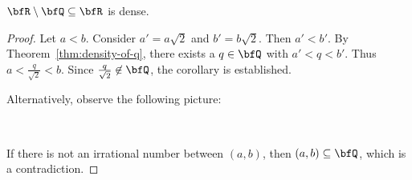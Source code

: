     \begin{corollary}
        $\bfR \setminus \bfQ \subseteq \bfR$ is dense.
    \end{corollary}
        \begin{proof}
            Let $a < b$. Consider $a' = a\sqrt{2}$ and $b' = b\sqrt{2}$. Then $a' < b'$. By Theorem~\ref{thm:density-of-q}, there exists a $q \in \bfQ$ with $a' < q < b'$. Thus $a < \frac{q}{\sqrt{2}} < b$. Since $\frac{q}{\sqrt{2}} \not\in \bfQ$, the corollary is established.

            Alternatively, observe the following picture:
                \begin{center}
                    \phantom{a}\\
                \end{center}
            If there is not an irrational number between $(a,b)$, then $(a,b) \subseteq \bfQ$, which is a contradiction.
        \end{proof}

